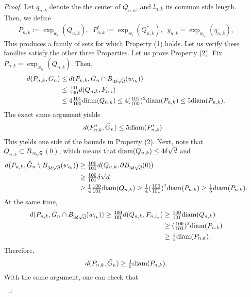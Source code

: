 \documentclass[11pt,reqno]{amsart}
\numberwithin{equation}{section}
\theoremstyle{plain}
\def\diam{\textnormal{diam}}
\begin{document}
\begin{proof}
    Let $q_{n,k}$ denote the the center of $Q_{n,k}$, and $l_{n,k}$ its common side length. Then, we define
    \begin{align*}		
      P_{n,k} := \exp_{w_i}(Q_{n,k}),\;\;P_{n,k}^*:=\exp_{w_i}(Q_{n,k}^*),\;\;y_{n,k} =\exp_{w_{i_k}}(q_{n,k}),
    \end{align*}	
    This produces a family of sets for which Property (1) holds. Let us verify these families satisfy the other three Properties. Let us prove Property (2). Fix $P_{n,k} = \exp_{w_{i_k}}(Q_{n,k})$. Then,
    \begin{align*}	
      d(P_{n,k},\tilde G_n) & \leq d(P_{n,k},\tilde G_n \cap B_{3\delta \sqrt{d}}(w_{i_k}))\\
	    & \leq \tfrac{101}{100}d(Q_{n,k},F_{n,i})\\
	    & \leq 4\tfrac{101}{100}\diam(Q_{n,k}) \leq 4(\tfrac{101}{100})^2\diam(P_{n,k}) \leq 5\diam(P_{n,k}).
    \end{align*}	
    The exact same argument yields
    \begin{align*}	
      d(P_{n,k}^*,\tilde G_n) & \leq 5\diam(P_{n,k}^*)
    \end{align*}	
    This yields one side of the bounds in Property (2). Next, note that  $Q_{n,k} \subset B_{2\delta \sqrt{d}}(0)$, which means that $\diam(Q_{n,k}) \leq 4\delta\sqrt{d}$ and
    \begin{align*}
      d(P_{n,k},\tilde G_n \setminus B_{3\delta \sqrt{d}}(w_{i_k})) & \geq \tfrac{100}{101}d(Q_{n,k},\partial B_{3\delta \sqrt{d}}(0))\\
	  & \geq \tfrac{100}{101}\delta \sqrt{d}\\
	  & \geq \tfrac{1}{4}\tfrac{100}{101}\diam(Q_{n,k})\geq \tfrac{1}{4}(\tfrac{100}{101})^2\diam(P_{n,k}) \geq \tfrac{1}{5}\diam(P_{n,k}).	  
    \end{align*}		
    At the same time,
    \begin{align*}	
      d(P_{n,k},\tilde G_n \cap B_{3\delta \sqrt{d}}(w_{i_k})) \geq \tfrac{100}{101}d(Q_{n,k},F_{n,i_k}) & \geq \tfrac{100}{101}\diam(Q_{n,k})\\
	  & \geq (\tfrac{100}{101})^2\diam(P_{n,k})\\
	  & \geq \tfrac{1}{5}\diam(P_{n,k}).
    \end{align*}
    Therefore,
    \begin{align*}	
      d(P_{n,k},\tilde G_n) \geq \tfrac{1}{5}\diam(P_{n,k}).
    \end{align*}	
    With the same argument, one can check that
    \begin{align*}	

\end{align*}
\end{proof}
\end{document}
